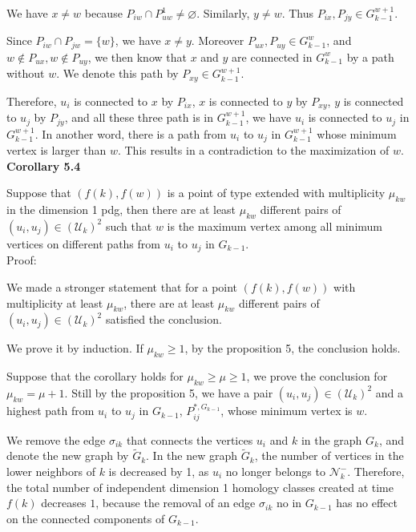 \documentclass[a4paper,12pt]{article}
\numberwithin{equation}{section}
\begin{document}
	We have $x \neq w$ because $P_{iw} \cap P^1_{uw} \neq \varnothing$. Similarly,  $y \neq w$. Thus $P_{ix}, P_{jy} \in G_{k-1}^{w+1}$.
	
	Since $P_{iw} \cap P_{jw} = \{w\}$, we have $x \neq y$. 	
	Moreover $P_{ux}, P_{uy} \in G^w_{k-1}$, and $w \notin P_{ux}, w \notin P_{uy}$, we then know that $x$ and $y$ are connected in $G^w_{k-1}$ by a path without $w$. We denote this path by $P_{xy} \in G_{k-1}^{w+1}$.
	
	Therefore, $u_i$ is connected to $x$ by $P_{ix}$, $x$ is connected to $y$ by $P_{xy}$, $y$ is connected to $u_j$ by $P_{jy}$, and all these three path is in $G_{k-1}^{w+1}$, we have $u_i$ is connected to $u_j$ in $G_{k-1}^{w+1}$. In another word, there is a path from $u_i$ to $u_j$ in $G_{k-1}^{w+1}$ whose minimum vertex is larger than $w$. This results in a contradiction to the maximization of $w$.\\
	
	
	\noindent \textbf{Corollary 5.4}
	
	Suppose that $(f(k),f(w))$ is a point of type extended with multiplicity $\mu_{kw}$ in the dimension 1 pdg, then there are at least $\mu_{kw}$ different pairs of $(u_i,u_j) \in (\mathcal{U}_k)^2$ such that $w$ is the maximum vertex among all minimum vertices on different paths from $u_i$ to $u_j$ in $G_{k-1}$.\\
	
	\noindent Proof:
	
	We made a stronger statement that for a point $(f(k),f(w))$ with multiplicity at least $\mu_{kw}$, there are at least $\mu_{kw}$ different pairs of $(u_i,u_j) \in (\mathcal{U}_k)^2$ satisfied the conclusion.
	
	We prove it by induction. If $\mu_{kw} \geq 1$, by the proposition 5, the conclusion holds.
	
	Suppose that the corollary holds for $\mu_{kw} \geq \mu \geq 1$, we prove the conclusion for $\mu_{kw} = \mu+1$. Still by the proposition 5, we have a pair $(u_i,u_j) \in (\mathcal{U}_k)^2$ and a highest path from $u_i$ to $u_j$ in $G_{k-1}$, $P_{ij}^{*,G_{k-1}}$, whose minimum vertex is $w$.
	
	We remove the edge $\sigma_{ik}$ that connects the vertices $u_i$ and $k$ in the graph $G_k$, and denote the new graph by $\tilde{G}_k$. In the new graph $\tilde{G}_k$, the number of vertices in the lower neighbors of $k$ is decreased by 1, as $u_i$ no longer belongs to $\mathcal{N}_k^-$. Therefore, the total number of independent dimension 1 homology classes created at time $f(k)$ decreases $1$, because the removal of an edge $\sigma_{ik}$ no in $G_{k-1}$ has no effect on the connected components of $G_{k-1}$.
	
\end{document}

